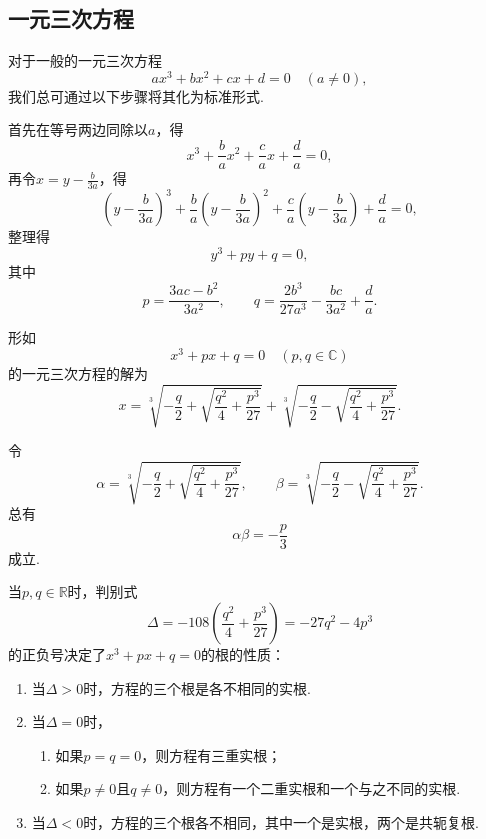 \subsection{一元三次方程}
对于一般的一元三次方程\[
ax^3+bx^2+cx+d=0 \quad(a\neq0),
\]我们总可通过以下步骤将其化为标准形式.

首先在等号两边同除以\(a\)，得\[
x^3+\frac{b}{a}x^2+\frac{c}{a}x+\frac{d}{a}=0,
\]再令\(x=y-\frac{b}{3a}\)，得\[
\left(y-\frac{b}{3a}\right)^3+\frac{b}{a}\left(y-\frac{b}{3a}\right)^2+\frac{c}{a}\left(y-\frac{b}{3a}\right)+\frac{d}{a}=0,
\]整理得\[
y^3+py+q=0,
\]其中\[
p = \frac{3ac-b^2}{3a^2}, \qquad
q = \frac{2b^3}{27a^3}-\frac{bc}{3a^2}+\frac{d}{a}.
\]

\begin{theorem}[卡丹公式]
\def\a{-\frac{q}{2}}%
\def\d{\frac{q^2}{4}+\frac{p^3}{27}}
\def\b{\sqrt{\d}}%
\def\c#1{\sqrt[3]{\a#1\b}}%
形如\[
x^3 + px + q = 0 \quad (p,q \in \mathbb{C})
\]的一元三次方程的解为\[
x = \c{+}+\c{-}.
\]

令\[
\alpha=\c{+}, \qquad \beta=\c{-}.
\]总有\[
\alpha \beta = -\frac{p}{3}
\]成立.

当\(p,q\in\mathbb{R}\)时，判别式\[
\Delta = -108\left(\d\right) = -27q^2-4p^3
\]的正负号决定了\(x^3+px+q=0\)的根的性质：\begin{enumerate}
\item 当\(\Delta>0\)时，方程的三个根是各不相同的实根.
\item 当\(\Delta=0\)时，\begin{enumerate}
	\item 如果\(p=q=0\)，则方程有三重实根；
	\item 如果\(p\neq0\)且\(q\neq0\)，则方程有一个二重实根和一个与之不同的实根.
	\end{enumerate}
\item 当\(\Delta<0\)时，方程的三个根各不相同，其中一个是实根，两个是共轭复根.
\end{enumerate}
\end{theorem}
